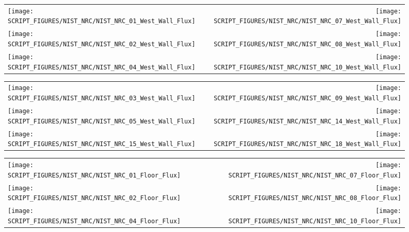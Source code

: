 \clearpage

\begin{figure}[!ht]
\begin{tabular*}{\textwidth}{l@{\extracolsep{\fill}}r}
\texttt{[image: SCRIPT\_FIGURES/NIST\_NRC/NIST\_NRC\_01\_West\_Wall\_Flux]} &
\texttt{[image: SCRIPT\_FIGURES/NIST\_NRC/NIST\_NRC\_07\_West\_Wall\_Flux]} \\
\texttt{[image: SCRIPT\_FIGURES/NIST\_NRC/NIST\_NRC\_02\_West\_Wall\_Flux]} &
\texttt{[image: SCRIPT\_FIGURES/NIST\_NRC/NIST\_NRC\_08\_West\_Wall\_Flux]} \\
\texttt{[image: SCRIPT\_FIGURES/NIST\_NRC/NIST\_NRC\_04\_West\_Wall\_Flux]} &
\texttt{[image: SCRIPT\_FIGURES/NIST\_NRC/NIST\_NRC\_10\_West\_Wall\_Flux]}
\end{tabular*}
\label{NIST_NRC_West_Wall_Flux_Closed}
\end{figure}

\begin{figure}[!ht]
\begin{tabular*}{\textwidth}{l@{\extracolsep{\fill}}r}
\texttt{[image: SCRIPT\_FIGURES/NIST\_NRC/NIST\_NRC\_03\_West\_Wall\_Flux]} &
\texttt{[image: SCRIPT\_FIGURES/NIST\_NRC/NIST\_NRC\_09\_West\_Wall\_Flux]} \\
\texttt{[image: SCRIPT\_FIGURES/NIST\_NRC/NIST\_NRC\_05\_West\_Wall\_Flux]} &
\texttt{[image: SCRIPT\_FIGURES/NIST\_NRC/NIST\_NRC\_14\_West\_Wall\_Flux]} \\
\texttt{[image: SCRIPT\_FIGURES/NIST\_NRC/NIST\_NRC\_15\_West\_Wall\_Flux]} &
\texttt{[image: SCRIPT\_FIGURES/NIST\_NRC/NIST\_NRC\_18\_West\_Wall\_Flux]}
\end{tabular*}
\label{NIST_NRC_West_Wall_Flux_Open}
\end{figure}

\begin{figure}[!ht]
\begin{tabular*}{\textwidth}{l@{\extracolsep{\fill}}r}
\texttt{[image: SCRIPT\_FIGURES/NIST\_NRC/NIST\_NRC\_01\_Floor\_Flux]} &
\texttt{[image: SCRIPT\_FIGURES/NIST\_NRC/NIST\_NRC\_07\_Floor\_Flux]} \\
\texttt{[image: SCRIPT\_FIGURES/NIST\_NRC/NIST\_NRC\_02\_Floor\_Flux]} &
\texttt{[image: SCRIPT\_FIGURES/NIST\_NRC/NIST\_NRC\_08\_Floor\_Flux]} \\
\texttt{[image: SCRIPT\_FIGURES/NIST\_NRC/NIST\_NRC\_04\_Floor\_Flux]} &
\texttt{[image: SCRIPT\_FIGURES/NIST\_NRC/NIST\_NRC\_10\_Floor\_Flux]}
\end{tabular*}
\label{NIST_NRC_Floor_Flux_Closed}
\end{figure}

